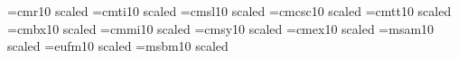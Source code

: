 \font@\seventeenrm=cmr10 scaled
\font@\seventeenit=cmti10 scaled
\font@\seventeensl=cmsl10 scaled
\font@\seventeensmc=cmcsc10 scaled
\font@\seventeentt=cmtt10 scaled
\font@\seventeenbf=cmbx10 scaled
\font@\seventeeni=cmmi10 scaled
\font@\seventeensy=cmsy10 scaled
\font@\seventeenex=cmex10 scaled
\font@\seventeenmsa=msam10 scaled
\font@\seventeeneufm=eufm10 scaled
\font@\seventeenmsb=msbm10 scaled
\newtoks\seventeenpoint@
\def\seventeenpoint{\normalbaselineskip18\p@
 \abovedisplayskip21.6\p@ plus5.2\p@ minus15.4\p@
 \belowdisplayskip\abovedisplayskip
 \abovedisplayshortskip\z@ plus5.2\p@
 \belowdisplayshortskip12.1\p@ plus5.2\p@ minus7\p@
 \textonlyfont@\rm\seventeenrm \textonlyfont@\it\seventeenit
 \textonlyfont@\sl\seventeensl \textonlyfont@\bf\seventeenbf
 \textonlyfont@\smc\seventeensmc \textonlyfont@\tt\seventeentt
 \ifsyntax@ \def\big##1{{\hbox{$\left##1\right.$}}}%
  \let\Big\big \let\bigg\big \let\Bigg\big
 \else
  \textfont\z@=\seventeenrm  \scriptfont\z@=\fourteenrm  
\scriptscriptfont\z@=\twelverm
  \textfont\@ne=\seventeeni  \scriptfont\@ne=\fourteeni  
\scriptscriptfont\@ne=\twelvei
  \textfont\tw@=\seventeensy \scriptfont\tw@=\fourteensy 
\scriptscriptfont\tw@=\twelvesy
  \textfont\thr@@=\seventeenex \scriptfont\thr@@=\fourteenex
        \scriptscriptfont\thr@@=\fourteenex
  \textfont\itfam=\seventeenit \scriptfont\itfam=\fourteenit
        \scriptscriptfont\itfam=\fourteenit
  \textfont\bffam=\seventeenbf \scriptfont\bffam=\fourteenbf
        \scriptscriptfont\bffam=\twelvebf
  \setbox\strutbox\hbox{\vrule height14.6\p@ depth6\p@ width\z@}%
  \setbox\strutbox@\hbox{\lower.86\normallineskiplimit\vbox{%
        \kern-\normallineskiplimit\copy\strutbox}}%
 \setbox\z@\vbox{\hbox{$($}\kern\z@}\bigsize@=2\ht\z@
 \fi
 \normalbaselines\rm\ex@.2326ex\jot5.2\ex@\the\seventeenpoint@}

\newif\iftab@\tab@false
\newif\ifvtab@\vtab@false
\def\tab{\bgroup\tab@true\vtab@false\vst@bfalse\Strich@false%
\def\\{\global\hline@@false%
\ifhline@\global\hline@false\global\hline@@true\fi\cr}
   \edef\l@{\the\leftskip}\ialign\bgroup\hskip\l@##\hfil&&##\hfil\cr}
\def\endtab{\cr\egroup\egroup}
\def\vtab{\vtop\bgroup\vst@bfalse\vtab@true\tab@true\Strich@false%
   \bgroup\def\\{\cr}\ialign\bgroup&##\hfil\cr}
\def\endvtab{\cr\egroup\egroup\egroup}
\def\stab{\D@cke0.5pt\catcode`\^^I=4 
 \bgroup\tab@true\vtab@false\vst@bfalse\Strich@true\Let@@\vspace@
 \normalbaselines\offinterlineskip
  \openup\spreadmlines@
 \edef\l@{\the\leftskip}\ialign
 \bgroup\hskip\l@##\hfil&&##\hfil\crcr}
\def\endstab{\crcr\egroup
 \egroup\catcode`\^^I=10 }
\newif\ifvst@b\vst@bfalse
\def\vstab{\D@cke0.5pt\catcode`\^^I=4 
 \vtop\bgroup\tab@true\vtab@false\vst@btrue\Strich@true\bgroup\Let@@\vspace@
 \normalbaselines\offinterlineskip
  \openup\spreadmlines@\bgroup}
\def\endvstab{\crcr\egroup\egroup
 \egroup\tab@false\Strich@false\catcode`\^^I=10 }

